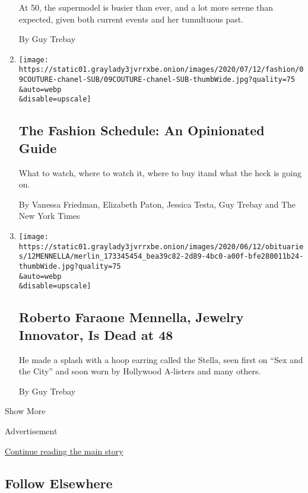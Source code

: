 \begin{enumerate}
  At 50, the supermodel is busier than ever, and a lot more serene than
  expected, given both current events and her tumultuous past.

  By Guy Trebay
\item
  \href{/article/fashion-week-trends-2020.html}{}

  \texttt{[image: https://static01.graylady3jvrrxbe.onion/images/2020/07/12/fashion/09COUTURE-chanel-SUB/09COUTURE-chanel-SUB-thumbWide.jpg?quality=75\\\&auto=webp\\\&disable=upscale]}

  \hypertarget{the-fashion-schedule-an-opinionated-guide}{%
  \subsection{The Fashion Schedule: An Opinionated
  Guide}\label{the-fashion-schedule-an-opinionated-guide}}

  What to watch, where to watch it, where to buy itand what the heck is
  going on.

  By Vanessa Friedman, Elizabeth Paton, Jessica Testa, Guy Trebay and
  The New York Times
\item
  \href{/2020/06/10/fashion/roberto-faraone-mennella-dead.html}{}

  \texttt{[image: https://static01.graylady3jvrrxbe.onion/images/2020/06/12/obituaries/12MENNELLA/merlin\_173345454\_bea39c82-2d89-4bc0-a00f-bfe280011b24-thumbWide.jpg?quality=75\\\&auto=webp\\\&disable=upscale]}

  \hypertarget{roberto-faraone-mennella-jewelry-innovator-is-dead-at-48}{%
  \subsection{Roberto Faraone Mennella, Jewelry Innovator, Is Dead at
  48}\label{roberto-faraone-mennella-jewelry-innovator-is-dead-at-48}}

  He made a splash with a hoop earring called the Stella, seen first on
  ``Sex and the City'' and soon worn by Hollywood A-listers and many
  others.

  By Guy Trebay
\end{enumerate}

Show More

Advertisement

\protect\hyperlink{after-mid2}{Continue reading the main story}

\hypertarget{follow-elsewhere}{%
\subsection{Follow Elsewhere}\label{follow-elsewhere}}

